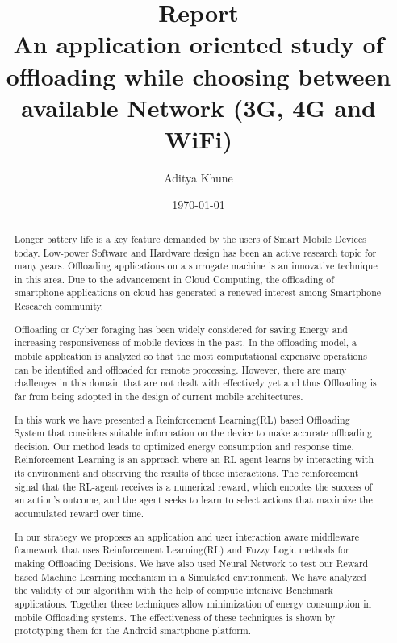 \documentclass{report}
\begin{document}
\title{Report\\
An application oriented study of offloading while
choosing between available Network (3G, 4G and WiFi)}

\author{Aditya Khune}

\date{\today}  %
\maketitle
\tableofcontents

\begin{abstract}
Longer battery life is a key feature demanded by the users of Smart Mobile Devices today. Low-power Software and Hardware design has been an active research topic for many years. Offloading applications on a surrogate machine is an innovative technique in this area. Due to the advancement in Cloud Computing, the offloading of smartphone applications on cloud has generated a renewed interest among Smartphone Research community.

Offloading or Cyber foraging has been widely considered for saving Energy and increasing responsiveness of mobile devices in the past.
In the offloading model, a mobile application is analyzed so that the most computational expensive operations can be identified and offloaded for remote processing. However, there are many challenges in this domain that are not dealt with effectively yet and thus Offloading is far from being adopted in the design of current mobile architectures.

In this work we have presented a Reinforcement Learning(RL) based Offloading System that considers suitable information on the device to make accurate offloading decision. Our method leads to optimized energy consumption and response time. Reinforcement Learning is an approach where an RL agent learns by interacting with its environment and observing the results of these interactions. The reinforcement signal that the RL-agent receives is a numerical reward, which encodes the success of an action’s outcome, and the agent seeks to learn to select actions that maximize the accumulated reward over time.

In our strategy we proposes an application and user interaction aware middleware framework that uses Reinforcement Learning(RL) and Fuzzy Logic methods for making Offloading Decisions. We have also used Neural Network to test our Reward based Machine Learning mechanism in a Simulated environment. We have analyzed the validity of our algorithm with the help of compute intensive Benchmark applications. Together these techniques allow minimization of energy consumption in mobile Offloading systems. The effectiveness of these techniques is shown by prototyping them for the Android smartphone platform.
\end{abstract}
\end{document}
